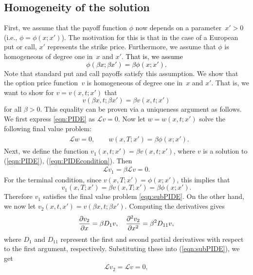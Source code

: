 \subsection{Homogeneity of the solution}
First, we assume that the payoff function $\phi$ now depends on a parameter~$x' > 0$ (i.e., $\phi = \phi(x;x')$).  The motivation for this is that in the case of a European put or call, $x'$ represents the strike price. Furthermore, we assume that $\phi$ is homogeneous of degree one in~$x$ and $x'$. \textcolor{black}{That is, we assume
$$
	\phi(\beta x; \beta x') = \beta \phi(x;x').
$$}
Note that standard put and call payoffs satisfy this assumption. We show that the option price function~$v$ is homogeneous of degree one in~$x$ and $x'$. That is, we want to show for $v = v(x,t; x')$ that
		\begin{equation}
			\label{eqn:homogen}
			v(\beta x, t; \beta x') = \beta v(x,t; x')
		\end{equation}
for all $\beta > 0$. This equality can be proven via a uniqueness argument as follows. We first express \eqref{eqn:PIDE} as $\mathscr{L} v = 0$. Now let $w = w(x,t; x')$ solve the following final value problem:
		\begin{align}
			\label{eqn:subPIDE}
			\begin{split}
			&\mathscr{L}w = 0, \qquad w(x,T; x') = \beta\phi(x;x').
			\end{split}
		\end{align}
Next, we define the function $v_1(x,t;x') = \beta v(x,t;x')$, where $v$ is a solution to (\ref{eqn:PIDE}), (\ref{eqn:PIDEcondition}). Then
	\begin{align*}
		\mathscr{L}v_1 = \beta \mathscr{L}v = 0.
	\end{align*}
For the terminal condition, since $v(x,T;x') = \phi(x;x')$, this implies that
	\begin{equation*}
		v_1(x,T;x') = \beta v(x,T; x') = \beta\phi(x;x').
	\end{equation*}
Therefore $v_1$ satisfies the final value problem \eqref{eqn:subPIDE}. On the other hand, we now let $v_2(x,t,x') = v(\beta x, t; \beta x')$. Computing the derivatives gives
	\begin{equation*}
		\frac{\partial v_2}{\partial x} = \beta D_1v, \quad \frac{\partial^2 v_2}{\partial x^2} = \beta^2 D_{11}v,
	\end{equation*}
where $D_1$ and $D_{11}$ represent the first and second partial derivatives with respect to the first argument, respectively. Substituting these into (\ref{eqn:subPIDE}), we get
	\begin{align*}
		\mathscr{L}v_2 = \mathscr{L}v = 0,
	\end{align*}
